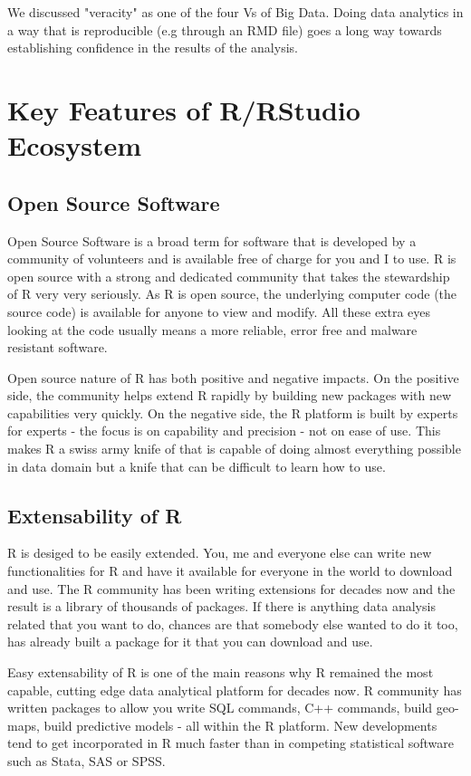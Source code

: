 \documentclass[10pt, letterpaper, twoside]{memoir}\usepackage{knitr}
\begin{document}
We discussed "veracity" as one of the four Vs of Big Data. Doing data analytics in a way that is reproducible (e.g through an RMD file) goes a long way towards establishing confidence in the results of the analysis.

\section{Key Features of R/RStudio Ecosystem}

\subsection{Open Source Software}

Open Source Software is a broad term for software that is developed by a community of volunteers and is available free of charge for you and I to use. R is open source with a strong and dedicated community that takes the stewardship of R very very seriously. 
As R is open source, the underlying computer code (the source code) is available for anyone to view and modify. All these extra eyes looking at the code usually means a more reliable, error free and malware resistant software. 

Open source nature of R has both positive and negative impacts. On the positive side, the community helps extend R rapidly by building new packages with new capabilities very quickly. On the negative side, the R platform is built by experts for experts - the focus is on capability and precision - not on ease of use. This makes R a swiss army knife of that is capable of doing almost everything possible in data domain but a knife that can be difficult to learn how to use.

\subsection{Extensability of R}

R is desiged to be easily extended. You, me and everyone else can write new functionalities for R and have it available for everyone in the world to download and use. The R community has been writing extensions for decades now and the result is a library of thousands of packages. If there is anything data analysis related that you want to do, chances are that somebody else wanted to do it too, has already built a package for it that you can download and use. 

Easy extensability of R is one of the main reasons why R remained the most capable, cutting edge data analytical platform for decades now. R community has written packages to allow you write SQL commands, C++ commands, build geo-maps, build predictive models - all within the R platform. New developments tend to get incorporated in R much faster than in competing statistical software such as Stata, SAS or SPSS.     
\end{document}
